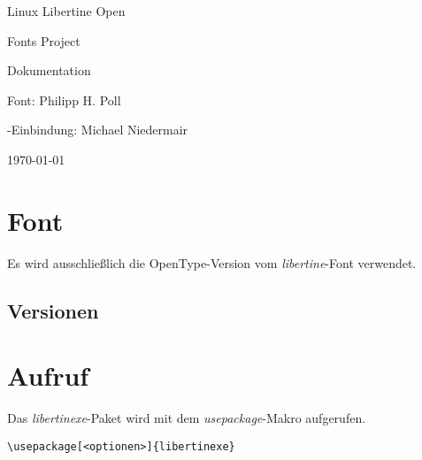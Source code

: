 \documentclass{fontdoku}
\begin{document}
\thispagestyle{empty}

\begin{minipage}{\linewidth}%
   \centering%
   \libertine\fontsize{36pt}{40pt}\selectfont%
   \textcolor{red}{}\quad%
   \fontsize{36pt}{40pt}\selectfont Linux Libertine Open\par
   \hfill\fontsize{36pt}{40pt}\selectfont Fonts Project\quad%
   \fontsize{36pt}{40pt}\selectfont\textcolor{red}{}\par
\end{minipage}

\vfill
\begin{center}
   \fontsize{46pt}{46pt}\selectfont Dokumentation
\end{center}

\vfill
\begin{center}\fontsize{20pt}{18pt}\selectfont
Font: Philipp H. Poll\par \XeLaTeX-Einbindung: Michael Niedermair
\end{center}

\vfill
\begin{center}
{\fontsize{6cm}{6cm}\selectfont{}}%
\hfill\fontsize{20pt}{18pt}\selectfont\today
\end{center}
\newpage

\section{Font}

Es wird ausschließlich die OpenType-Version vom \emph{libertine}-Font verwendet.

\subsection{Versionen}



\section{Aufruf}

Das \emph{libertinexe}-Paket wird mit dem \emph{usepackage}-Makro aufgerufen.

\begin{lstlisting}
\usepackage[<optionen>]{libertinexe}
\end{lstlisting}
\end{document}

